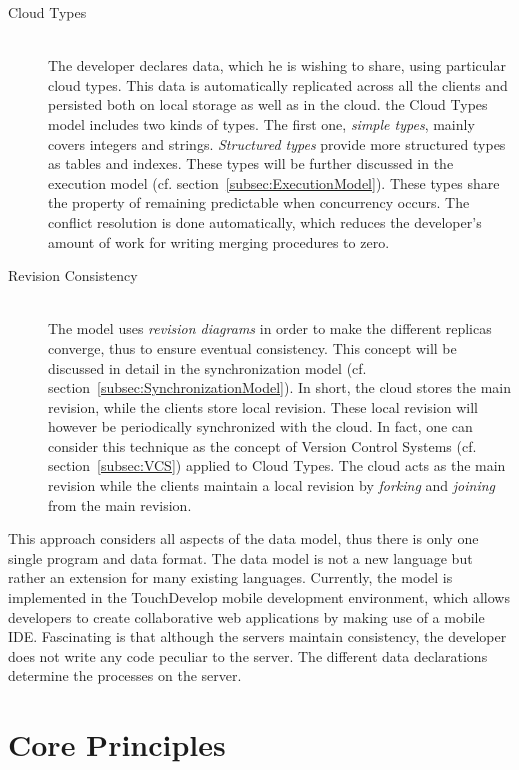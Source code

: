 \documentclass[a4paper,12pt]{report}
\begin{document}
\begin{description}
    \item[Cloud Types] \hfill \\The developer declares data, which he is wishing to share, using particular cloud types. This data is automatically replicated across all the clients and persisted both on local storage as well as in the cloud. the Cloud Types model includes two kinds of types. The first one, \textit{simple types}, mainly covers integers and strings. \textit{Structured types} provide more structured types as tables and indexes. These types will be further discussed in the execution model (cf. section~\ref{subsec:ExecutionModel}). These types share the property of remaining predictable when concurrency occurs. The conflict resolution is done automatically, which reduces the developer's amount of work for writing merging procedures to zero.
    \item[Revision Consistency] \hfill \\ The model uses \textit{revision diagrams} in order to make the different replicas converge, thus to ensure eventual consistency. This concept will be discussed in detail in the synchronization model (cf. section~\ref{subsec:SynchronizationModel}). In short, the cloud stores the main revision, while the clients store local revision. These local revision will however be periodically synchronized with the cloud. In fact, one can consider this technique as the concept of Version Control Systems (cf. section~\ref{subsec:VCS}) applied to Cloud Types. The cloud acts as the main revision while the clients maintain a local revision by \textit{forking} and \textit{joining} from the main revision.
\end{description} 

This approach considers all aspects of the data model, thus there is only one single program and data format. The data model is not a new language but rather an extension for many existing languages. Currently, the model is implemented in the TouchDevelop mobile development environment, which allows developers to create collaborative web applications by making use of a mobile IDE. Fascinating is that although the servers maintain consistency, the developer does not write any code peculiar to the server. The different data declarations determine the processes on the server. 

\section{Core Principles}\label{sec:CorePrinciples}
\end{document}

